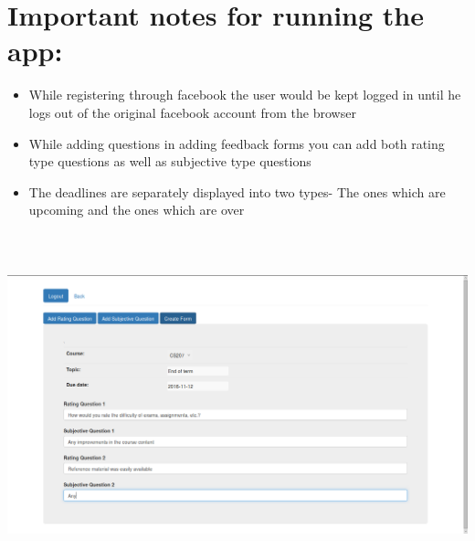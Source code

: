 \documentclass{article}
\begin{document}
\section{Important notes for running the app:}
\begin{itemize}
\item While registering through facebook the user would be kept logged in until he logs out of the original facebook account from the browser
\item While adding questions in adding feedback forms you can add both rating type questions as well as subjective type questions 
\item The deadlines are separately displayed into two types- The ones which are upcoming and the ones which are over
\end{itemize}
\hfill \break	
\includegraphics[width=15cm, height=10cm]{photos/feedback.png}
\newpage
\end{document}
